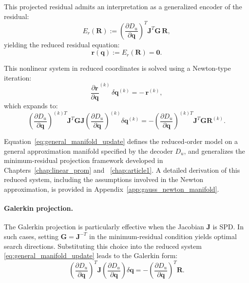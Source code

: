 This projected residual admits an interpretation as a generalized encoder of the residual:
\begin{equation}
E_r(\mathbf{R}) := 
\left(\frac{\partial D_u}{\partial \mathbf{q}}\right)^T 
\mathbf{J}^T 
\mathbf{G} \, \mathbf{R},
\label{eq:general_residual_encoder}
\end{equation}
yielding the reduced residual equation:
\begin{equation}
\mathbf{r}(\mathbf{q}) := E_r\left(\mathbf{R}\right) = \mathbf{0}.
\end{equation}


This nonlinear system in reduced coordinates is solved using a Newton-type iteration:
\begin{equation}
\frac{\partial \mathbf{r}}{\partial \mathbf{q}}^{(k)} \, \delta \mathbf{q}^{(k)} = -\,\mathbf{r}^{(k)},
\end{equation}
which expands to:
\begin{equation}
\left(
\frac{\partial D_u}{\partial \mathbf{q}}
\right)^{(k)T}
\!\!\mathbf{J}^T 
\mathbf{G} 
\mathbf{J}
\left(
\frac{\partial D_u}{\partial \mathbf{q}}
\right)^{(k)} \delta \mathbf{q}^{(k)}
= -
\left(
\frac{\partial D_u}{\partial \mathbf{q}}
\right)^{(k) T}
\!\!\mathbf{J}^T 
\mathbf{G} 
\mathbf{R}^{(k)}.
\label{eq:general_manifold_update}
\end{equation}



Equation~\eqref{eq:general_manifold_update} defines the reduced-order model on a general approximation manifold specified by the decoder \( D_u \), and generalizes the minimum-residual projection framework developed in Chapters~\ref{chap:linear_prom} and ~\ref{chap:article1}. A detailed derivation of this reduced system, including the assumptions involved in the Newton approximation, is provided in Appendix~\ref{app:gauss_newton_manifold}.

\paragraph{Galerkin projection.} 
The Galerkin projection is particularly effective when the Jacobian \( \mathbf{J} \) is SPD. In such cases, setting \( \mathbf{G} = \mathbf{J}^{-T} \) in the minimum-residual condition yields optimal search directions. Substituting this choice into the reduced system \eqref{eq:general_manifold_update} leads to the Galerkin form:
\begin{equation}
\left( \frac{\partial D_u}{\partial \mathbf{q}} \right)^T 
\mathbf{J} 
\left( \frac{\partial D_u}{\partial \mathbf{q}} \right) \delta \mathbf{q} 
= - \left( \frac{\partial D_u}{\partial \mathbf{q}} \right)^T \mathbf{R}.
\label{eq:prom_general_galerkin}
\end{equation}

